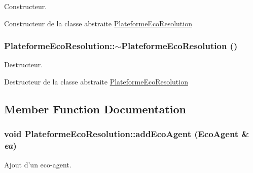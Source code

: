 Constructeur. 

Constructeur de la classe abstraite \hyperlink{classPlateformeEcoResolution}{PlateformeEcoResolution} \hypertarget{classPlateformeEcoResolution_356b4862f53c4be870304e5186601b5a}{
\subsubsection[{$\sim$PlateformeEcoResolution}]{\setlength{\rightskip}{0pt plus 5cm}PlateformeEcoResolution::$\sim$PlateformeEcoResolution ()}}
\label{classPlateformeEcoResolution_356b4862f53c4be870304e5186601b5a}


Destructeur. 

Destructeur de la classe abstraite \hyperlink{classPlateformeEcoResolution}{PlateformeEcoResolution} 

\subsection{Member Function Documentation}
\hypertarget{classPlateformeEcoResolution_6fdb4c8ecc62252da4326d9763d4f28d}{
\subsubsection[{addEcoAgent}]{\setlength{\rightskip}{0pt plus 5cm}void PlateformeEcoResolution::addEcoAgent ({\bf EcoAgent} \& {\em ea})}}
\label{classPlateformeEcoResolution_6fdb4c8ecc62252da4326d9763d4f28d}


Ajout d'un eco-agent. 

